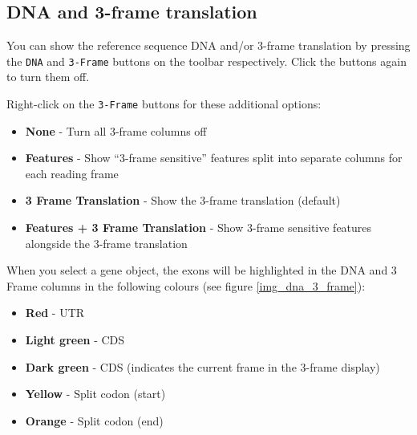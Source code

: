 \documentclass[letterpaper]{article}
\begin{document}
\subsection{DNA and 3-frame translation} \label{sec_dna_3_frame}
You can show the reference sequence DNA and/or 3-frame translation by pressing the \lstinline{DNA} and \lstinline{3-Frame} buttons on the toolbar respectively. Click the buttons again to turn them off.

Right-click on the \lstinline{3-Frame} buttons for these additional options:
\begin{itemize}
\item \textbf{None} - Turn all 3-frame columns off
\item \textbf{Features} - Show ``3-frame sensitive'' features split into separate columns for each reading frame
\item \textbf{3 Frame Translation} - Show the 3-frame translation (default)
\item \textbf{Features + 3 Frame Translation} - Show 3-frame sensitive features alongside the 3-frame translation
\end{itemize}

When you select a gene object, the exons will be highlighted in the DNA and 3 Frame columns in the following colours (see figure \ref{img_dna_3_frame}):
\begin{itemize}
\item \textbf{Red} - UTR
\item \textbf{Light green} - CDS
\item \textbf{Dark green} - CDS (indicates the current frame in the 3-frame display)
\item \textbf{Yellow} - Split codon (start)
\item \textbf{Orange} - Split codon (end) 
\end{itemize}
\end{document}

